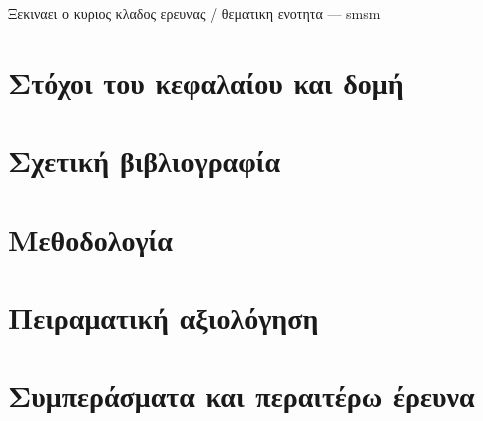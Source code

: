 Ξεκιναει ο κυριος κλαδος ερευνας / θεματικη ενοτητα --- smsm

\section{Στόχοι του κεφαλαίου και δομή}
  \label{section:02_02_01}
  

\section{Σχετική βιβλιογραφία}
  \label{section:02_02_02}
  

\section{Μεθοδολογία}
  \label{section:02_02_03}
  

\section{Πειραματική αξιολόγηση}
  \label{section:02_02_04}
  

\section{Συμπεράσματα και περαιτέρω έρευνα}
  \label{section:02_02_05}
  
